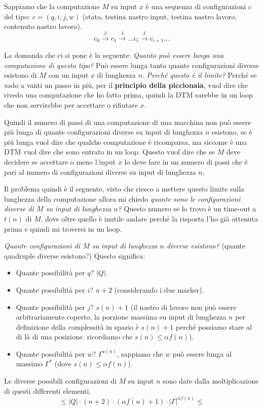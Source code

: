 \documentclass{article}
\begin{document}
Sappiamo che la computazione $M$ su input $x$ è una sequenza di configurazioni $c$ del tipo: $c=(q,i,j,w)$ (stato,
testina nastro input, testina nastro lavoro, contenuto nastro lavoro).
$$c_0\overset{\delta}{\rightarrow}c_1\overset{\delta}{\rightarrow}\dots c_i\overset{\delta}{\rightarrow}c_{i+1}\dots$$

La domanda che
ci si pone è la seguente: \textit{Quanto può essere lunga una computazione di questo tipo?}
Può essere lunga tanto quante configurazioni diverse esistono di $M$ con un input $x$ di lunghezza $n$.
\textit{Perché questo è il limite?} Perché se vado a vanti un passo in più, per il \textbf{principio
della piccionaia}, vuol dire che rivedo una computazione che ho fatto prima, quindi la DTM sarebbe
in un loop che non servirebbe per accettare o rifiutare $x$.

Quindi il numero di passi di una computazione di una macchina non può essere più lunga di quante
configurazioni diverse su input di lunghezza $n$ esistono, se è più lunga vuol dire che qualche
computazione è ricomparsa, ma siccome è una DTM vuol dire che sono entrato in un loop. Questo
vuol dire che se $M$ deve decidere se accettare o meno l'input $x$ lo deve fare in un numero di passi
che è pari al numero di configurazioni diverse su input di lunghezza $n$.

Il problema quindi è il seguente, visto che riesco a mettere questo limite sulla lunghezza della computazione
allora mi chiedo \textit{quante sono le configurazioni diverse di $M$ su input di lunghezza $n$?}
Questo numero se lo trovo è un time-out a $t(n)$ di $M$, dove oltre quello è inutile andare
perché la risposta l'ho già ottenuta prima e quindi mi troverei in un loop.

\textit{Quante configurazioni di $M$ su input di lunghezza $n$ diverse esistono?} (quante
quadruple diverse esistono?) Questo significa:
\begin{itemize}
    \item Quante possibilità per $q$? $|Q|$.
    \item Quante possibilità per $i$? $n+2$ (considerando i due marker).
    \item Quante possibilità per $j$? $s(n)+1$ (il nastro di lavoro non può
    essere arbitrariamente coperto, la porzione massima su input di lunghezza $n$
    per definizione della complessità in spazio è $s(n)+1$ perché possiamo stare
    al di là di una posizione. ricordiamo che $s(n)\leq\alpha f(n)$).
    \item Quante possibilità per $w$? $\Gamma^{s(n)}$, sappiamo che $w$ può essere
    lunga al massimo $\Gamma^*$ (dove $s(n)\leq\alpha f(n)$).
\end{itemize}
Le diverse possibili configurazioni di $M$ su input $n$ sono date dalla moltiplicazione di questi
differenti elementi.
$$\leq |Q|\cdot(n+2)\cdot(\alpha f(n)+1)\cdot|\Gamma|^{\alpha f(n)}\leq$$
\end{document}
